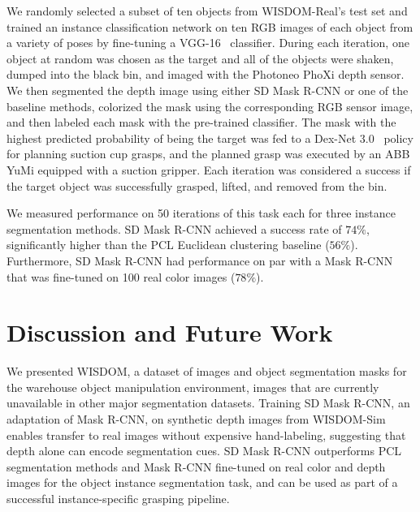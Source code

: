 \documentclass[letterpaper, 10 pt, conference]{ieeeconf}  \pdfoutput=1
\numberwithin{equation}{section}
\begin{document}
We randomly selected a subset of ten objects from WISDOM-Real's test set and trained an instance classification network on ten RGB images of each object from a variety of poses by fine-tuning a VGG-16~\cite{simonyan2014very} classifier.
During each iteration, one object at random was chosen as the target and all of the objects were shaken, dumped into the black bin, and imaged with the Photoneo PhoXi depth sensor.
We then segmented the depth image using either SD Mask R-CNN or one of the baseline methods, colorized the mask using the corresponding RGB sensor image, and then labeled each mask with the pre-trained classifier.
The mask with the highest predicted probability of being the target was fed to a Dex-Net 3.0~\cite{mahler2017dex} policy for planning suction cup grasps, and the planned grasp was executed by an ABB YuMi equipped with a suction gripper.
Each iteration was considered a success if the target object was successfully grasped, lifted, and removed from the bin.

We measured performance on 50 iterations of this task each for three instance segmentation methods.
SD Mask R-CNN achieved a success rate of $74\%$, significantly higher than the PCL Euclidean clustering baseline ($56\%$).
Furthermore, SD Mask R-CNN had performance on par with a Mask R-CNN that was fine-tuned on 100 real color images ($78\%$).





















 \section{Discussion and Future Work}
 We presented WISDOM, a dataset of images and object segmentation masks for the warehouse object manipulation environment, images that are currently unavailable in other major segmentation datasets. Training SD Mask R-CNN, an adaptation of Mask R-CNN, on synthetic depth images from WISDOM-Sim enables transfer to real images without expensive hand-labeling, suggesting that depth alone can encode segmentation cues. SD Mask R-CNN outperforms PCL segmentation methods and Mask R-CNN fine-tuned on real color and depth images for the object instance segmentation task, and can be used as part of a successful instance-specific grasping pipeline.
\end{document}
